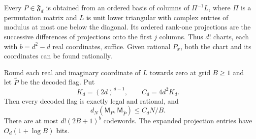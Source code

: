 \begin{lemma}\label{lem:flagatlas72}
Every $P\in\mathfrak F_d$ is obtained from an ordered basis of columns
of $\Pi^{-1}L$, where $\Pi$ is a permutation matrix and $L$ is unit
lower triangular with complex entries of modulus at most one below
the diagonal. Its ordered rank-one projections are the successive
differences of projections onto the first $j$ columns. Thus $d!$
charts, each with $b=d^2-d$ real coordinates, suffice. Given rational
$P_x$, both the chart and its coordinates can be found rationally.

Round each real and imaginary coordinate of $L$ towards zero at grid
$B\ge1$ and let $\widehat P$ be the decoded flag. Put
\[
 K_d=(2d)^{d-1},\qquad C_d=4d^2K_d.
\]
Then every decoded flag is exactly legal and rational, and
\begin{equation}\label{eq:flaground72}
 d_N(\mathsf M_P,\mathsf M_{\widehat P})\le C_dN/B.
\end{equation}
There are at most $d!(2B+1)^b$ codewords. The expanded projection
entries have $O_d(1+\log B)$ bits.
\end{lemma}
